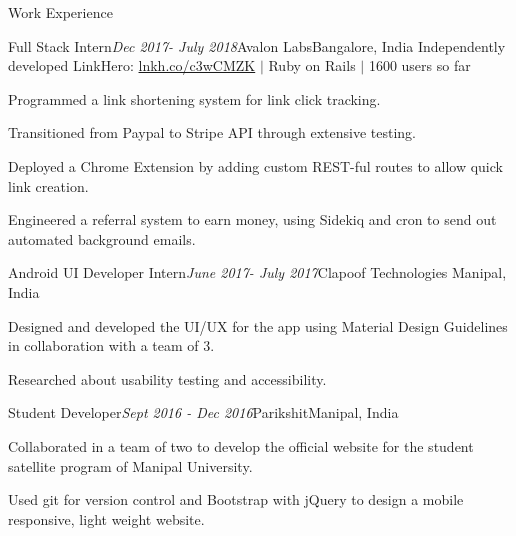 \documentclass{resume} %
\begin{document}
\begin{rSection}{Work Experience}

    \begin{rSubsection}{Full Stack Intern}{\em Dec 2017- July 2018}{Avalon Labs}{Bangalore, India}
    Independently developed LinkHero: \href{http://lnkh.co/c3wCMZK}{lnkh.co/c3wCMZK} $\vert$ Ruby on Rails $\vert$ 1600 users so far
    \item
    Programmed a link shortening system for link click tracking.
    \item 
    Transitioned from Paypal to Stripe API through extensive testing.
    \item
    Deployed a Chrome Extension by adding custom REST-ful routes to allow quick link creation.
    \item Engineered a referral system to earn money, using Sidekiq and cron to send out automated background emails.
    \end{rSubsection}
    
    \begin{rSubsection}{Android UI Developer Intern}{\em June 2017- July 2017}{Clapoof Technologies}{ Manipal, India}
    \item Designed and developed the UI/UX for the app using Material Design Guidelines in collaboration with a team of 3.
    \item Researched about usability testing and accessibility.
    \end{rSubsection}
    
    \begin{rSubsection}{Student Developer}{\em Sept 2016 - Dec 2016}{Parikshit}{Manipal, India}
    \item Collaborated in a team of two to develop the official website for the student satellite program of Manipal University.
    \item Used git for version control and Bootstrap with jQuery to design a mobile responsive, light weight website. 
    \end{rSubsection}
\end{rSection}
\end{document}
